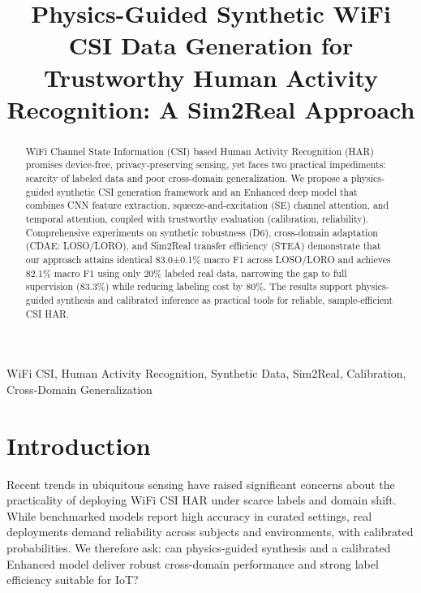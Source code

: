 \documentclass[journal]{IEEEtran}
\begin{document}
\title{Physics-Guided Synthetic WiFi CSI Data Generation for Trustworthy Human Activity Recognition: A Sim2Real Approach}

\author{
}

\maketitle

\begin{abstract}
WiFi Channel State Information (CSI) based Human Activity Recognition (HAR) promises device-free, privacy-preserving sensing, yet faces two practical impediments: scarcity of labeled data and poor cross-domain generalization. We propose a physics-guided synthetic CSI generation framework and an Enhanced deep model that combines CNN feature extraction, squeeze-and-excitation (SE) channel attention, and temporal attention, coupled with trustworthy evaluation (calibration, reliability). Comprehensive experiments on synthetic robustness (D6), cross-domain adaptation (CDAE: LOSO/LORO), and Sim2Real transfer efficiency (STEA) demonstrate that our approach attains identical 83.0±0.1\% macro F1 across LOSO/LORO and achieves 82.1\% macro F1 using only 20\% labeled real data, narrowing the gap to full supervision (83.3\%) while reducing labeling cost by 80\%. The results support physics-guided synthesis and calibrated inference as practical tools for reliable, sample-efficient CSI HAR.
\end{abstract}

\begin{IEEEkeywords}
WiFi CSI, Human Activity Recognition, Synthetic Data, Sim2Real, Calibration, Cross-Domain Generalization
\end{IEEEkeywords}

\section{Introduction}
Recent trends in ubiquitous sensing have raised significant concerns about the practicality of deploying WiFi CSI HAR under scarce labels and domain shift. While benchmarked models report high accuracy in curated settings, real deployments demand reliability across subjects and environments, with calibrated probabilities. We therefore ask: can physics-guided synthesis and a calibrated Enhanced model deliver robust cross-domain performance and strong label efficiency suitable for IoT?
\end{document}
